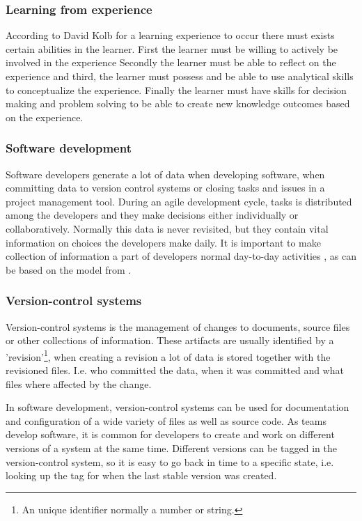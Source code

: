 \subsubsection{Learning from experience}
According to David Kolb\citep{KolbModel} for a learning experience to occur there must exists certain abilities in the learner. First the learner must be willing to actively be involved in the experience Secondly the learner must be able to reflect on the experience and third, the learner must possess and be able to use analytical skills to conceptualize the experience. Finally the learner must have skills for decision making and problem solving to be able to create new knowledge outcomes based on the experience.

\subsubsection{Software development}
Software developers generate a lot of data when developing software, when committing data to version control systems or closing tasks and issues in a project management tool. During an agile development cycle, tasks is distributed among the developers and they make decisions either individually or collaboratively. Normally this data is never revisited, but they contain vital information on choices the developers make daily. It is important to make collection of information a part of developers normal day-to-day activities , as can be based on the model from \citep{Krogstie2009}.

\subsubsection{Version-control systems}
Version-control systems is the management of changes to documents, source files or other collections of information. These artifacts are usually identified by a 'revision'\footnote{An unique identifier normally a number or string.}, when creating a revision a lot of data is stored together with the revisioned files. I.e. who committed the data, when it was committed and what files where affected by the change.

In software development, version-control systems can be used for documentation and configuration of a wide variety of files as well as source code. As teams develop software, it is common for developers to create and work on different versions of a system at the same time. Different versions can be tagged in the version-control system, so it is easy to go back in time to a specific state, i.e. looking up the tag for when the last stable version was created.

